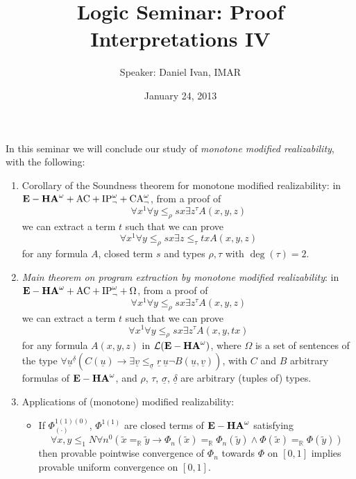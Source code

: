 \documentclass[a4paper,12pt]{article}
\title{Logic Seminar: Proof Interpretations IV}
\author{Speaker: Daniel Ivan, IMAR}
\date{January 24, 2013}
\begin{document}
\maketitle
In this seminar we will conclude our study of \emph{monotone modified realizability}, with the following:
\thispagestyle{empty}
\begin{enumerate}
\item Corollary of the Soundness theorem for monotone modified realizability: in ${\bf E-HA}^\omega + {\rm AC} + {\rm IP}_\lnot^\omega + {\rm CA}_\lnot^\omega$, from a proof of 
\begin{equation*}
 \forall x^1 \forall y\leq_\rho sx \exists z^\tau A(x,y,z)
\end{equation*}
we can extract a term $t$ such that we can prove 
\begin{equation*}
\forall x^1 \forall y\leq_\rho sx \exists z\leq_\tau tx A(x,y,z)
\end{equation*}
for any formula $A$, closed term $s$ and types $\rho,\tau$ with $\deg(\tau)=2$.
  \item \emph{Main theorem on program extraction by \emph{monotone} modified realizability}: in ${\bf E-HA}^\omega+{\rm AC}+{\rm IP}^\omega_{\lnot} + \Omega$, from a proof of 
\begin{equation*}
 \forall x^1 \forall y\leq_{\rho} sx \exists z^\tau A(x,y,z)
\end{equation*}
we can extract a term $t$ such that we can prove 
\begin{equation*}
\forall x^1 \forall y\leq_\rho sx \exists z^\tau  A(x,y, tx)
\end{equation*}
for any formula $A(x,y,z)$ in $\mathcal{L}({\bf E-HA}^\omega)$, where $\Omega$ is a set of sentences of the type 
$\forall \underline{u}^{\underline{\delta}} (C(\underline{u}) \rightarrow \exists \underline{v} \leq_{\underline{\sigma}} \underline{r}\,\underline{u} \lnot B(\underline{u}, \underline{v}))$, with $C$ and $B$ arbitrary formulas of ${\bf E-HA}^\omega$, and $\rho$, $\tau$, $\underline{\sigma}$, $\underline{\delta}$ are arbitrary (tuples of) types.
\item Applications of (monotone) modified realizability:
\begin{itemize}
 \item If $\Phi_{(\cdot)}^{1(1)(0)}$, $\Phi^{1(1)}$ are closed terms of ${\bf E-HA}^\omega$ satisfying
\begin{equation*}
 \forall x, y\leq_1 N \forall n^0 (\tilde{x} =_\mathbb{R} \tilde{y} \rightarrow \Phi_n(\tilde{x}) =_\mathbb{R} \Phi_n(\tilde{y}) \land \Phi(\tilde{x}) =_\mathbb{R} \Phi(\tilde{y}))
\end{equation*}
then provable pointwise convergence of $\Phi_n$ towards $\Phi$ on $[0,1]$ implies provable uniform convergence on $[0,1]$.


\end{itemize}
\end{enumerate}
\end{document}
